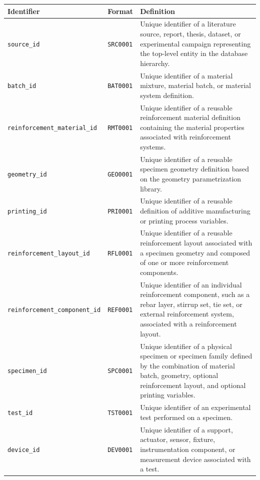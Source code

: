 \documentclass[11pt]{book}
\begin{document}
{\begin{longtable}{p{}p{}p{}}
\hline
\textbf{Identifier} & \textbf{Format} & \textbf{Definition} \\
\hline
\endhead

\texttt{source\_id} & \texttt{SRC0001} &
Unique identifier of a literature source, report, thesis, dataset, or experimental campaign representing the top-level entity in the database hierarchy. \\

\texttt{batch\_id} & \texttt{BAT0001} &
Unique identifier of a material mixture, material batch, or material system definition. \\

\texttt{reinforcement\_material\_id} & \texttt{RMT0001} &
Unique identifier of a reusable reinforcement material definition containing the material properties associated with reinforcement systems. \\

\texttt{geometry\_id} & \texttt{GEO0001} &
Unique identifier of a reusable specimen geometry definition based on the geometry parametrization library. \\

\texttt{printing\_id} & \texttt{PRI0001} &
Unique identifier of a reusable definition of additive manufacturing or printing process variables. \\

\texttt{reinforcement\_layout\_id} & \texttt{RFL0001} &
Unique identifier of a reusable reinforcement layout associated with a specimen geometry and composed of one or more reinforcement components. \\

\texttt{reinforcement\_component\_id} & \texttt{REF0001} &
Unique identifier of an individual reinforcement component, such as a rebar layer, stirrup set, tie set, or external reinforcement system, associated with a reinforcement layout. \\

\texttt{specimen\_id} & \texttt{SPC0001} &
Unique identifier of a physical specimen or specimen family defined by the combination of material batch, geometry, optional reinforcement layout, and optional printing variables. \\

\texttt{test\_id} & \texttt{TST0001} &
Unique identifier of an experimental test performed on a specimen. \\

\texttt{device\_id} & \texttt{DEV0001} &
Unique identifier of a support, actuator, sensor, fixture, instrumentation component, or measurement device associated with a test. \\


\end{longtable}}
\end{document}
